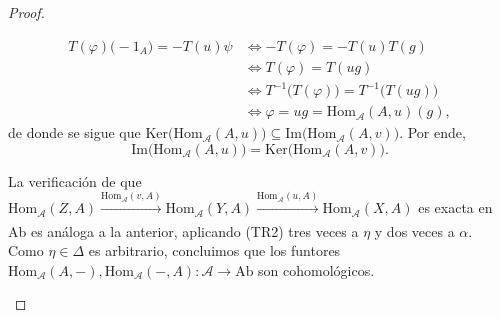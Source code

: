 \documentclass[tesis]{subfiles}
\begin{document}
\begin{proof}
\begin{enumerate}[label=(\alph*)]
    \begin{align*}
        T(\varphi)\big(-1_A\big) = -T(u)\psi &\iff -T(\varphi) = -T(u)T(g) \\
            &\iff T(\varphi) = T(ug) \\
            &\iff T^{-1}\big( T(\varphi)\big) = T^{-1}\big( T(ug) \big) \\
            &\iff \varphi = ug = \text{Hom}_\mathscr{A}(A,u)(g),
    \end{align*}
    de donde se sigue que $\text{Ker}\big( \text{Hom}_\mathscr{A}(A,u) \big) \subseteq\text{Im}\big( \text{Hom}_\mathscr{A}(A,v) \big)$. Por ende,
    \[
    \text{Im}\big( \text{Hom}_\mathscr{A}(A,u) \big) =\text{Ker}\big( \text{Hom}_\mathscr{A}(A,v) \big).
    \] 

    La verificación de que $\text{Hom}_\mathscr{A}(Z,A) \xrightarrow[]{\text{Hom}_\mathscr{A}(v,A)} \text{Hom}_\mathscr{A}(Y,A) \xrightarrow[]{\text{Hom}_\mathscr{A}(u,A)} \text{Hom}_\mathscr{A}(X,A)$ es exacta en Ab es análoga a la anterior, aplicando (TR2) tres veces a $\eta$ y dos veces a $\alpha$. Como $\eta\in\Delta$ es arbitrario, concluimos que los funtores $\text{Hom}_\mathscr{A}(A,-),\text{Hom}_\mathscr{A}(-,A):\mathscr{A}\to \text{Ab}$ son cohomológicos.


\end{enumerate}
\end{proof}
\end{document}
